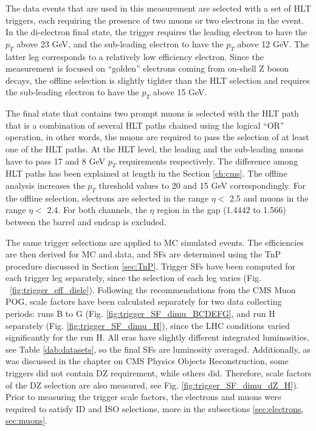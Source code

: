 The data events that are used in this measurement are selected with a set of HLT triggers, each requiring the presence of two muons or two electrons in the event. In the di-electron final state, the trigger requires the leading electron to have the $p_T$ above 23 GeV, and the sub-leading electron to have the $p_T$ above 12 GeV. The latter leg corresponds to a relatively low efficiency electron. Since the measurement is focused on ``golden'' electrons coming from on-shell Z boson decays, the offline selection is slightly tighter than the HLT selection and requires the sub-leading electron to have the $p_T$ above 15 GeV.

The final state that contains two prompt muons is selected with the HLT path that is a combination of several HLT paths chained using the logical ``OR'' operation, in other words, the muons are required to pass the selection of at least one of the HLT paths. At the HLT level, the leading and the sub-leading muons have to pass 17 and 8 GeV $p_T$ requirements respectively. The difference among HLT paths has been explained at length in the Section \ref{ch:cms}. The offline analysis increases the $p_T$ threshold values to 20 and 15 GeV correspondingly. For the offline selection, electrons are selected in the range $\eta < $ 2.5 and muons in the range $\eta < $  2.4. For both channels, the $\eta$ region in the gap (1.4442 to 1.566) between the barrel and endcap is excluded.

The same trigger selections are applied to MC simulated events. The efficiencies are then derived for MC and data, and SFs are determined using the TnP procedure discussed in Section \ref{sec:TnP}. Trigger SFs have been computed for each trigger leg separately, since the selection of each leg varies (Fig. ~\ref{fig:trigger_eff_diele}). Following the recommendations from the CMS Muon POG, scale factors have been calculated separately for two data collecting periods: runs B to G (Fig. \ref{fig:trigger_SF_dimu_BCDEFG}, and run H separately (Fig. \ref{fig:trigger_SF_dimu_H}), since the LHC conditions varied significantly for the run H. All eras have slightly different integrated luminosities, see Table \ref{dab:datasets}, so the final SFs are luminosity averaged. Additionally, as was discussed in the chapter on CMS Physics Objects Reconstruction, some triggers did not contain DZ requirement, while others did. Therefore, scale factors of the DZ selection are also measured, see Fig. \ref{fig:trigger_SF_dimu_dZ_H}). Prior to measuring the trigger scale factors, the electrons and muons were required to satisfy ID and ISO selections, more in the subsections \ref{sec:electrons, sec:muons}. 


